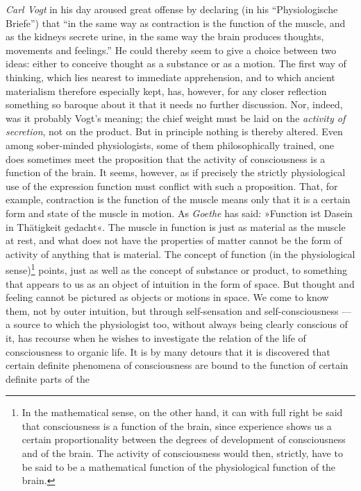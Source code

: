 \documentclass[12pt,a4paper]{book}
\newcommand{\opage}[1]{\marginnote{\footnotesize\textit{[#1]}}}
\begin{document}
\emph{Carl Vogt} in his day aroused great offense by declaring (in his
``Physiologische Briefe'') that ``in the same way as contraction is the
function of the muscle, and as the kidneys secrete urine, in the same
way the brain produces thoughts, movements and feelings.'' He could
thereby seem to give a choice between two ideas: either to conceive
thought
\opage{72}as a substance or as a motion. The first way of thinking,
which lies nearest to immediate apprehension, and to which ancient
materialism therefore especially kept, has, however, for any closer
reflection something so baroque about it that it needs no further
discussion. Nor, indeed, was it probably Vogt's meaning; the chief
weight must be laid on the \emph{activity of secretion}, not on the
product. But in principle nothing is thereby altered. Even among
sober-minded physiologists, some of them philosophically trained, one
does sometimes meet the proposition that the activity of consciousness
is a function of the brain. It seems, however, as if precisely the
strictly physiological use of the expression function must conflict
with such a proposition. That, for example, contraction is the function
of the muscle means only that it is a certain form and state of the
muscle in motion. As \emph{Goethe} has said: »Function ist Dasein in
Thätigkeit gedacht«. The muscle in function is just as material as the
muscle at rest, and what does not have the properties of matter cannot
be the form of activity of anything that is material. The concept of
function
(in the physiological sense)\footnote{In the mathematical sense, on the
other hand, it can with full right be said that consciousness is a
function of the brain, since experience shows us a certain
proportionality between the degrees of development of consciousness and
of the brain. The activity of consciousness would then, strictly, have
to be said to be a mathematical function of the physiological function
of the brain.} points, just as well as the concept of substance or
product, to something that appears to us as an object of intuition in
the form of space. But thought and feeling cannot be pictured as
objects or motions in space. We come to know them, not by outer
intuition, but through self-sensation and self-consciousness --- a
source to which the physiologist too, without always being clearly
conscious of it, has recourse when he wishes to investigate the
relation of the life of consciousness to organic life. It is by many
detours that it is discovered that certain definite phenomena of
consciousness are bound to the function of certain definite parts of the
\end{document}
